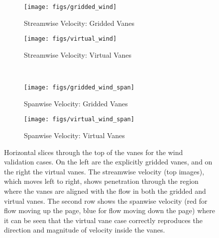 \begin{figure}
  \begin{subfigure}{0.49\textwidth}
   \centering
   \texttt{[image: figs/gridded\_wind]}
   \caption{Streamwise Velocity: Gridded Vanes}
  \end{subfigure}
  \begin{subfigure}{0.49\textwidth}  
   \centering
   \texttt{[image: figs/virtual\_wind]}
   \caption{Streamwise Velocity: Virtual Vanes}
   \end{subfigure} \\
  \begin{subfigure}{0.49\textwidth}
   \centering
   \texttt{[image: figs/gridded\_wind\_span]}
   \caption{Spanwise Velocity: Gridded Vanes}
  \end{subfigure}
  \begin{subfigure}{0.49\textwidth}
   \centering
  \texttt{[image: figs/virtual\_wind\_span]}
   \caption{Spanwise Velocity: Virtual Vanes}
  \end{subfigure}
 \caption{Horizontal slices through the top of the vanes for the
 wind validation cases. On the left are the explicitly gridded vanes,
 and on the right the virtual vanes. The streamwise velocity (top
 images), which moves left to right, shows penetration through the
 region where the vanes are aligned with the flow in both the gridded
 and virtual vanes. The second row shows the spanwise velocity (red for
 flow moving up the page, blue for flow moving down the page) where it
 can be seen that the virtual vane case correctly reproduces the
 direction and magnitude of velocity inside the vanes.}  
 \label{fig:wind_val}
\end{figure}

